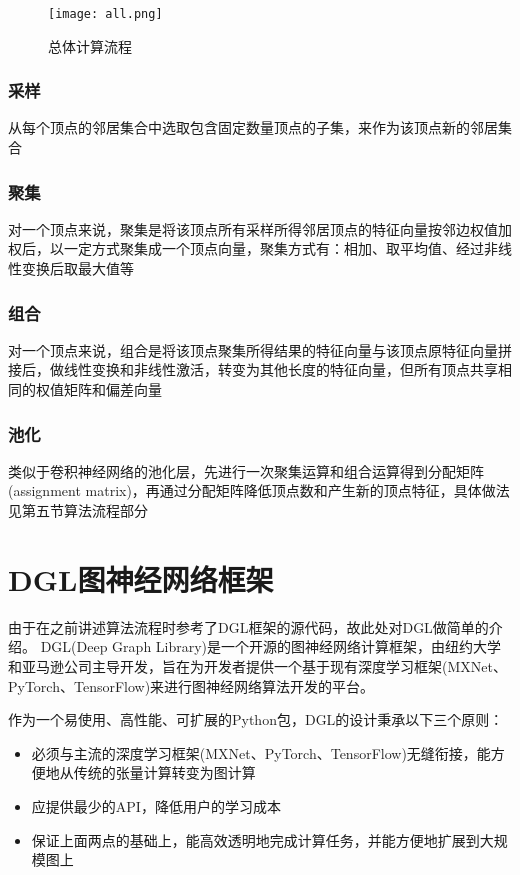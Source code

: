 \begin{figure}[htb]
    \centering
    \texttt{[image: all.png]}
    \caption{总体计算流程}
\end{figure}

\subsubsection{采样}
从每个顶点的邻居集合中选取包含固定数量顶点的子集，来作为该顶点新的邻居集合

\subsubsection{聚集}
对一个顶点来说，聚集是将该顶点所有采样所得邻居顶点的特征向量按邻边权值加权后，以一定方式聚集成一个顶点向量，聚集方式有：相加、取平均值、经过非线性变换后取最大值等

\subsubsection{组合}
对一个顶点来说，组合是将该顶点聚集所得结果的特征向量与该顶点原特征向量拼接后，做线性变换和非线性激活，转变为其他长度的特征向量，但所有顶点共享相同的权值矩阵和偏差向量

\subsubsection{池化}
类似于卷积神经网络的池化层，先进行一次聚集运算和组合运算得到分配矩阵(assignment matrix)，再通过分配矩阵降低顶点数和产生新的顶点特征，具体做法见第五节算法流程部分

\section{DGL图神经网络框架}
由于在之前讲述算法流程时参考了DGL框架的源代码，故此处对DGL做简单的介绍。
DGL(Deep Graph Library)是一个开源的图神经网络计算框架，由纽约大学和亚马逊公司主导开发，旨在为开发者提供一个基于现有深度学习框架(MXNet、PyTorch、TensorFlow)来进行图神经网络算法开发的平台。

作为一个易使用、高性能、可扩展的Python包，DGL的设计秉承以下三个原则：
\begin{itemize}
    \item 必须与主流的深度学习框架(MXNet、PyTorch、TensorFlow)无缝衔接，能方便地从传统的张量计算转变为图计算
    \item 应提供最少的API，降低用户的学习成本
    \item 保证上面两点的基础上，能高效透明地完成计算任务，并能方便地扩展到大规模图上
\end{itemize}

